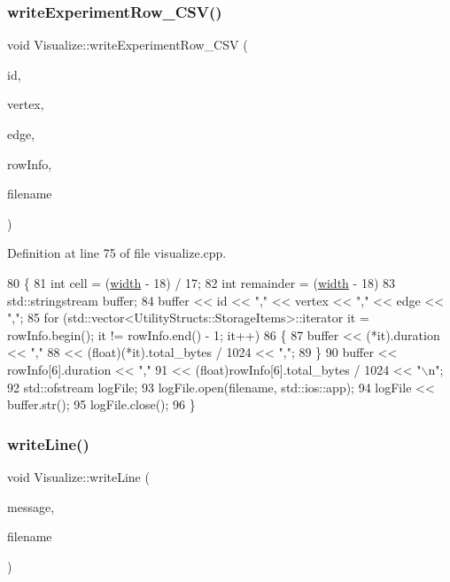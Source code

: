 \subsubsection{\texorpdfstring{write\+Experiment\+Row\+\_\+\+C\+S\+V()}{writeExperimentRow\_CSV()}}
{\footnotesize\ttfamily void Visualize\+::write\+Experiment\+Row\+\_\+\+C\+SV (\begin{DoxyParamCaption}\item[{int}]{id,  }\item[{int}]{vertex,  }\item[{int}]{edge,  }\item[{std\+::vector$<$ \hyperlink{struct_utility_structs_1_1_storage_items}{Utility\+Structs\+::\+Storage\+Items} $>$}]{row\+Info,  }\item[{std\+::string}]{filename }\end{DoxyParamCaption})}



Definition at line 75 of file visualize.\+cpp.


\begin{DoxyCode}
80 \{
81     \textcolor{keywordtype}{int} cell = (\hyperlink{class_visualize_af5ac723ad5f8fe8c4a8378bf1299cda7}{width} - 18) / 17;
82     \textcolor{keywordtype}{int} remainder = (\hyperlink{class_visualize_af5ac723ad5f8fe8c4a8378bf1299cda7}{width} - 18) %
83     std::stringstream buffer;
84     buffer << \textcolor{keywordtype}{id} << \textcolor{stringliteral}{","} << vertex << \textcolor{stringliteral}{","} << edge << \textcolor{stringliteral}{","};
85     \textcolor{keywordflow}{for} (std::vector<UtilityStructs::StorageItems>::iterator it = rowInfo.begin(); it != rowInfo.end() - 1;
       it++)
86     \{
87         buffer << (*it).duration << \textcolor{stringliteral}{","}
88                << (float)(*it).total\_bytes / 1024 << \textcolor{stringliteral}{","};
89     \}
90     buffer << rowInfo[6].duration << \textcolor{stringliteral}{","}
91            << (float)rowInfo[6].total\_bytes / 1024 << \textcolor{stringliteral}{"\(\backslash\)n"};
92     std::ofstream logFile;
93     logFile.open(filename, std::ios::app);
94     logFile << buffer.str();
95     logFile.close();
96 \}
\end{DoxyCode}
\mbox{\label{class_visualize_a9ccde29aab876a829335775898373e96}} 
\subsubsection{\texorpdfstring{write\+Line()}{writeLine()}}
{\footnotesize\ttfamily void Visualize\+::write\+Line (\begin{DoxyParamCaption}\item[{std\+::string}]{message,  }\item[{std\+::string}]{filename }\end{DoxyParamCaption})}

